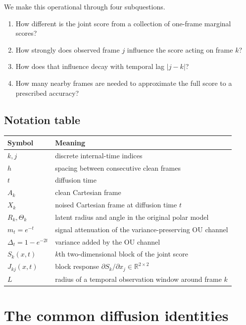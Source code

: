 \documentclass[11pt,a4paper]{article}
\newcommand{\R}{\mathbb{R}}
\begin{document}
We make this operational through four subquestions.
\begin{enumerate}
\item How different is the joint score from a collection of one-frame marginal scores?
\item How strongly does observed frame $j$ influence the score acting on frame $k$?
\item How does that influence decay with temporal lag $|j-k|$?
\item How many nearby frames are needed to approximate the full score to a prescribed accuracy?
\end{enumerate}

\subsection{Notation table}

\begin{table}[H]
\centering
\small
\begin{tabularx}{\textwidth}{@{}lX@{}}
\toprule
Symbol & Meaning \\
\midrule
$k,j$ & discrete internal-time indices \\
$h$ & spacing between consecutive clean frames \\
$t$ & diffusion time \\
$A_k$ & clean Cartesian frame \\
$X_k$ & noised Cartesian frame at diffusion time $t$ \\
$R_k,\Theta_k$ & latent radius and angle in the original polar model \\
$m_t=e^{-t}$ & signal attenuation of the variance-preserving OU channel \\
$\Delta_t=1-e^{-2t}$ & variance added by the OU channel \\
$S_k(x,t)$ & $k$th two-dimensional block of the joint score \\
$J_{kj}(x,t)$ & block response $\partial S_k/\partial x_j\in\R^{2\times2}$ \\
$L$ & radius of a temporal observation window around frame $k$ \\
\bottomrule
\end{tabularx}
\end{table}

\section{The common diffusion identities}
\end{document}
